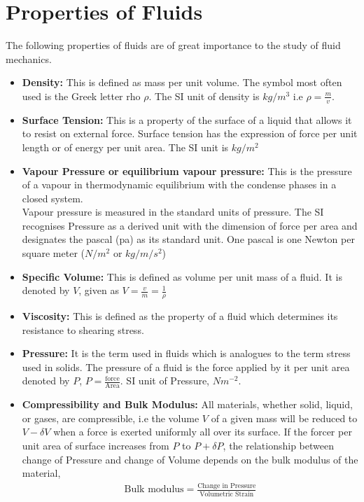 \documentclass[11pt]{report}
\newcommand{\bt}[1]{\textbf{#1}}
\begin{document}
	\section{Properties of Fluids}
	The following properties of fluids are of great importance to the study of fluid mechanics.
	\begin{itemize}[label=--]
		\item \bt{Density:} This is defined as mass per unit volume. The symbol most often used is the Greek letter rho $\rho$. The SI unit of density is $kg/m^3$ i.e $\rho = \frac{m}{v}$.
		
		\item \bt{Surface Tension:} This is a property of the surface of a liquid that allows it to resist on external force. Surface tension has the expression of force per unit length or of energy per unit area. The SI unit is $kg/m^2$
		
		\item \bt{Vapour Pressure or equilibrium vapour pressure: } This is the pressure of a vapour in thermodynamic equilibrium with the condense phases in a closed system.\\
		Vapour pressure is measured in the standard units of pressure. The SI recognises Pressure as a derived unit with the dimension of force per area and designates the pascal (pa) as its standard unit. One pascal is one Newton per square meter ($N/m^2$ or $kg/m/s^2$)
		
		\item \bt{Specific Volume:} This is defined as volume per unit mass of a fluid. It is denoted by $V$, given as $V=\frac{v}{m} = \frac{1}{\rho}$
		
		\item \bt{Viscosity:} This is defined as the property of a fluid which determines its resistance to shearing stress.
		
		\item \bt{Pressure:} It is the term used in fluids which is analogues to the term stress used in solids. The pressure of a fluid is the force applied by it per unit area denoted by $P$, $P = \frac{\text{force}}{\text{Area}}$. SI unit of Pressure, $Nm^{-2}$.
		
		\item \bt{Compressibility and Bulk Modulus:} All materials, whether solid, liquid, or gases, are compressible, i.e the volume $V$ of a given mass will be reduced to $V-\delta V$ when a force is exerted uniformly all over its surface. If the forcer per unit area of surface increases from $P$ to $P+\delta P$, the relationship between change of Pressure and change of Volume depends on the bulk modulus of the material,
		\begin{eqnarray*}
			\text{Bulk modulus} = \frac{\text{Change in Pressure}}{\text{Volumetric Strain}}
		\end{eqnarray*}
	

\end{itemize}
\end{document}
